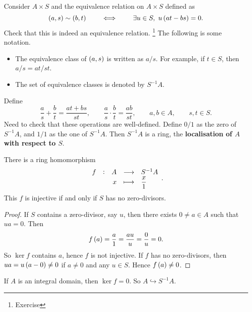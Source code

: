 \begin{definition}
Consider $ A \times S $ and the equivalence relation on $ A \times S $ defined as
$$ \br{a, s} \sim \br{b, t} \qquad \iff \qquad \exists u \in S, \ u\br{at - bs} = 0. $$
Check that this is indeed an equivalence relation. \footnote{Exercise} The following is some notation.
\begin{itemize}
\item The equivalence class of $ \br{a, s} $ is written as $ a / s $. For example, if $ t \in S $, then $ a / s = at / st $.
\item The set of equivalence classes is denoted by $ S^{-1}A $.
\end{itemize}
Define
$$ \dfrac{a}{s} + \dfrac{b}{t} = \dfrac{at + bs}{st}, \qquad \dfrac{a}{s} \cdot \dfrac{b}{t} = \dfrac{ab}{st}, \qquad a, b \in A, \qquad s, t \in S. $$
Need to check that these operations are well-defined. Define $ 0 / 1 $ as the zero of $ S^{-1}A $, and $ 1 / 1 $ as the one of $ S^{-1}A $. Then $ S^{-1}A $ is a ring, the \textbf{localisation of $ A $ with respect to $ S $}.
\end{definition}

\begin{lemma}
There is a ring homomorphism
$$ \function[f]{A}{S^{-1}A}{x}{\dfrac{x}{1}}. $$
This $ f $ is injective if and only if $ S $ has no zero-divisors.
\end{lemma}

\begin{proof}
If $ S $ contains a zero-divisor, say $ u $, then there exists $ 0 \ne a \in A $ such that $ ua = 0 $. Then
$$ f\br{a} = \dfrac{a}{1} = \dfrac{au}{u} = \dfrac{0}{u} = 0. $$
So $ \ker f $ contains $ a $, hence $ f $ is not injective. If $ f $ has no zero-divisors, then $ ua = u\br{a - 0} \ne 0 $ if $ a \ne 0 $ and any $ u \in S $. Hence $ f\br{a} \ne 0 $.
\end{proof}


If $ A $ is an integral domain, then $ \ker f = 0 $. So $ A \hookrightarrow S^{-1}A $.

\pagebreak

